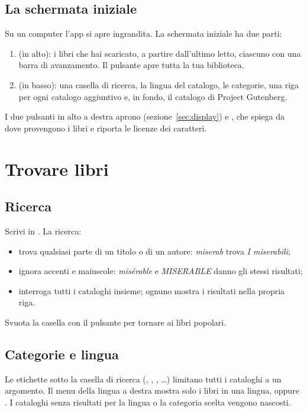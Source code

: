 \documentclass[11pt]{article}
\begin{document}
\subsection{La schermata iniziale}
Su un computer l’app si apre ingrandita. La schermata iniziale ha due parti:

\begin{enumerate}
  \item {} (in alto): i libri che hai scaricato, a partire dall’ultimo letto,
        ciascuno con una barra di avanzamento. Il pulsante  apre tutta
        la tua biblioteca.
  \item {} (in basso): una casella di ricerca, la lingua del catalogo, le
        categorie, una riga per ogni catalogo aggiuntivo e, in fondo, il catalogo di Project
        Gutenberg.
\end{enumerate}


I due pulsanti in alto a destra aprono  (sezione~\ref{sec:display}) e
, che spiega da dove provengono i libri e riporta le licenze dei caratteri.

\section{Trovare libri}

\subsection{Ricerca}
Scrivi in . La ricerca:
\begin{itemize}
  \item trova qualsiasi parte di un titolo o di un autore: \emph{miserab} trova
        \emph{I miserabili};
  \item ignora accenti e maiuscole: \emph{misérable} e \emph{MISERABLE} danno gli stessi
        risultati;
  \item interroga tutti i cataloghi insieme; ognuno mostra i risultati nella propria riga.
\end{itemize}
Svuota la casella con il pulsante  per tornare ai libri popolari.

\subsection{Categorie e lingua}
Le etichette sotto la casella di ricerca (, , ,
…) limitano tutti i cataloghi a un argomento. Il menu della lingua a destra mostra solo
i libri in una lingua, oppure . I cataloghi senza risultati per la lingua o la
categoria scelta vengono nascosti.
\end{document}
